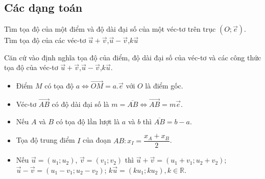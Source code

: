 \subsection{Các dạng toán}
\begin{dang}%
{Tìm tọa độ của một điểm và độ dài đại số của một véc-tơ trên trục $(O;\vec{e})$. Tìm tọa độ của các véc-tơ  $\vec{u}+\vec{v}$,$\vec{u}-\vec{v}$,$k\vec{u}$}

Căn cứ vào định nghĩa tọa độ của điểm, độ dài đại số của véc-tơ và các công thức tọa độ của véc-tơ  $\vec{u}+\vec{v}$,$\vec{u}-\vec{v}$,$k\vec{u}$.
\begin{itemize}
\item Điểm $M$ có tọa độ $a \Leftrightarrow \vec{OM}=a.\vec{e}$ với $O$ là điểm gốc.
\item Véc-tơ $\vec{AB}$ có độ dài đại số là $m=\overline{AB}\Leftrightarrow \vec{AB}=m\vec{e}$.
\item Nếu $A$ và $B$ có tọa độ lần lượt là $a$ và $b$ thì $\overline{AB}=b-a$.
\item Tọa độ trung điểm $I$ của đoạn $AB: x_I=\dfrac{x_A + x_B}{2}$.
\item Nếu $\vec{u}=(u_1;u_2)$, $\vec{v}=(v_1;v_2)$ thì $\vec{u}+\vec{v}=(u_1+v_1;u_2+v_2)$; $\vec{u}-\vec{v}=(u_1-v_1;u_2-v_2)$; $k\vec{u}=(ku_1;ku_2), k\in \mathbb{R}$.
\end{itemize}
\end{dang}
